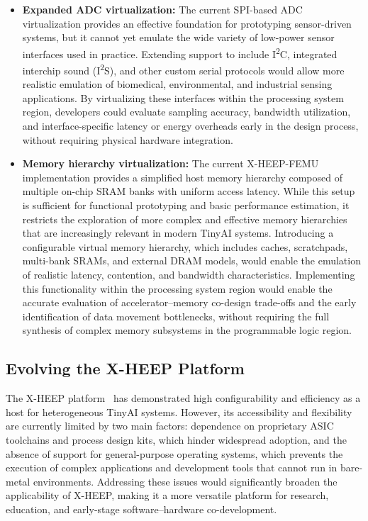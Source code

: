             \vspace{-1em}
            \begin{itemize}
                \item \textbf{Expanded ADC virtualization:} The current SPI-based ADC virtualization provides an effective foundation for prototyping sensor-driven systems, but it cannot yet emulate the wide variety of low-power sensor interfaces used in practice. Extending support to include I\textsuperscript{2}C, integrated interchip sound (I\textsuperscript{2}S), and other custom serial protocols would allow more realistic emulation of biomedical, environmental, and industrial sensing applications. By virtualizing these interfaces within the processing system region, developers could evaluate sampling accuracy, bandwidth utilization, and interface-specific latency or energy overheads early in the design process, without requiring physical hardware integration.
            
                \item \textbf{Memory hierarchy virtualization:} The current \mbox{X-HEEP-FEMU} implementation provides a simplified host memory hierarchy composed of multiple on-chip SRAM banks with uniform access latency. While this setup is sufficient for functional prototyping and basic performance estimation, it restricts the exploration of more complex and effective memory hierarchies that are increasingly relevant in modern TinyAI systems. Introducing a configurable virtual memory hierarchy, which includes caches, scratchpads, multi-bank SRAMs, and external DRAM models, would enable the emulation of realistic latency, contention, and bandwidth characteristics. Implementing this functionality within the processing system region would enable the accurate evaluation of accelerator–memory co-design trade-offs and the early identification of data movement bottlenecks, without requiring the full synthesis of complex memory subsystems in the programmable logic region.
            \end{itemize}
            \vspace{-1em}
        
        \subsection{Evolving the X-HEEP Platform}
        
            The \mbox{X-HEEP} platform~\cite{x-heep} has demonstrated high configurability and efficiency as a host for heterogeneous TinyAI systems. However, its accessibility and flexibility are currently limited by two main factors: dependence on proprietary ASIC toolchains and process design kits, which hinder widespread adoption, and the absence of support for general-purpose operating systems, which prevents the execution of complex applications and development tools that cannot run in bare-metal environments. Addressing these issues would significantly broaden the applicability of \mbox{X-HEEP}, making it a more versatile platform for research, education, and early-stage software–hardware co-development.
            
